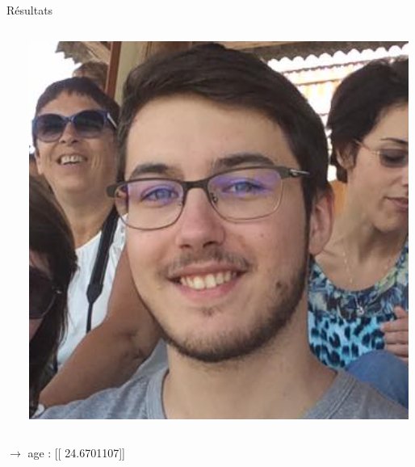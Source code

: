 \documentclass[compress]{beamer}
\begin{document}
\begin{frame}{Résultats}
  \begin{columns}
    \begin{column}{0.6\linewidth}
      \inputminted[fontsize=\scriptsize]{python}{code2.py}
    \end{column}
    \begin{column}{0.4\linewidth}
      \centering
      \includegraphics[width=\linewidth]{resources/clem}
    \end{column}
  \end{columns}
    $\rightarrow$ age : [[ 24.6701107]]
\end{frame}
\end{document}
